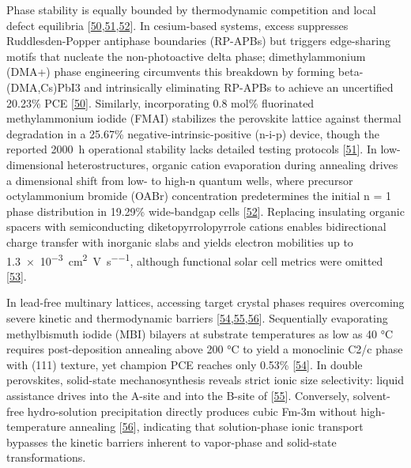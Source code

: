 \documentclass[
  11pt,
]{article}
\begin{document}
Phase stability is equally bounded by thermodynamic competition and
local defect equilibria
{[}\href{https://doi.org/10.1002/adma.74538}{50},\href{https://doi.org/10.1002/aenm.71396}{51},\href{https://doi.org/10.1002/advs.76791}{52}{]}.
In cesium-based systems, excess  suppresses Ruddlesden-Popper
antiphase boundaries (RP-APBs) but triggers edge-sharing 
motifs that nucleate the non-photoactive delta phase; dimethylammonium
(DMA+) phase engineering circumvents this breakdown by forming
beta-(DMA,Cs)PbI3 and intrinsically eliminating RP-APBs to achieve an
uncertified 20.23\% PCE
{[}\href{https://doi.org/10.1002/adma.74538}{50}{]}. Similarly,
incorporating 0.8 mol\% fluorinated methylammonium iodide (FMAI)
stabilizes the perovskite lattice against thermal degradation in a
25.67\% negative-intrinsic-positive (n-i-p) device, though the reported
\qty{2000}{\hour} operational stability lacks detailed testing protocols
{[}\href{https://doi.org/10.1002/aenm.71396}{51}{]}. In low-dimensional
heterostructures, organic cation evaporation during annealing drives a
dimensional shift from low- to high-n quantum wells, where precursor
octylammonium bromide (OABr) concentration predetermines the initial n =
1 phase distribution in 19.29\% wide-bandgap cells
{[}\href{https://doi.org/10.1002/advs.76791}{52}{]}. Replacing
insulating organic spacers with semiconducting diketopyrrolopyrrole
cations enables bidirectional charge transfer with inorganic
 slabs and yields electron mobilities up to
\qty{1.3e-3}{\centi\meter\squared\per\volt\per\second}, although
functional solar cell metrics were omitted
{[}\href{https://doi.org/10.1002/adma.74681}{53}{]}.

In lead-free multinary lattices, accessing target crystal phases
requires overcoming severe kinetic and thermodynamic barriers
{[}\href{https://doi.org/10.1016/j.solener.2026.114961}{54},\href{https://doi.org/10.26434/chemrxiv.15008057/v1}{55},\href{https://doi.org/10.1038/s43246-026-01261-3}{56}{]}.
Sequentially evaporating methylbismuth iodide (MBI) bilayers at
substrate temperatures as low as 40 °C requires post-deposition
annealing above 200 °C to yield a monoclinic C2/c phase with (111)
texture, yet champion PCE reaches only 0.53\%
{[}\href{https://doi.org/10.1016/j.solener.2026.114961}{54}{]}. In
double perovskites, solid-state mechanosynthesis reveals strict ionic
size selectivity: liquid assistance drives  into the A-site and
 into the B-site of 
{[}\href{https://doi.org/10.26434/chemrxiv.15008057/v1}{55}{]}.
Conversely, solvent-free hydro-solution precipitation directly produces
cubic Fm-3m  without high-temperature annealing
{[}\href{https://doi.org/10.1038/s43246-026-01261-3}{56}{]}, indicating
that solution-phase ionic transport bypasses the kinetic barriers
inherent to vapor-phase and solid-state transformations.
\end{document}
